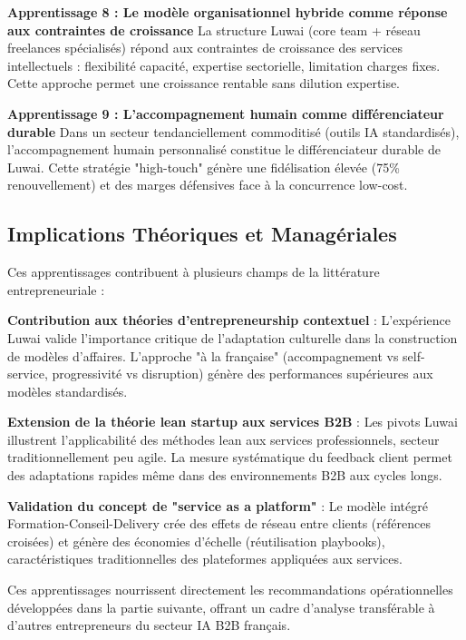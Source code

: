 \textbf{Apprentissage 8 : Le modèle organisationnel hybride comme réponse aux contraintes de croissance}
La structure Luwai (core team + réseau freelances spécialisés) répond aux contraintes de croissance des services intellectuels : flexibilité capacité, expertise sectorielle, limitation charges fixes. Cette approche permet une croissance rentable sans dilution expertise.

\textbf{Apprentissage 9 : L'accompagnement humain comme différenciateur durable}
Dans un secteur tendanciellement commoditisé (outils IA standardisés), l'accompagnement humain personnalisé constitue le différenciateur durable de Luwai. Cette stratégie "high-touch" génère une fidélisation élevée (75\% renouvellement) et des marges défensives face à la concurrence low-cost.

\subsection{Implications Théoriques et Managériales}

Ces apprentissages contribuent à plusieurs champs de la littérature entrepreneuriale :

\textbf{Contribution aux théories d'entrepreneurship contextuel} \cite{welter2011contextualizing} :
L'expérience Luwai valide l'importance critique de l'adaptation culturelle dans la construction de modèles d'affaires. L'approche "à la française" (accompagnement vs self-service, progressivité vs disruption) génère des performances supérieures aux modèles standardisés.

\textbf{Extension de la théorie lean startup aux services B2B} \cite{ries2011lean} :
Les pivots Luwai illustrent l'applicabilité des méthodes lean aux services professionnels, secteur traditionnellement peu agile. La mesure systématique du feedback client permet des adaptations rapides même dans des environnements B2B aux cycles longs.

\textbf{Validation du concept de "service as a platform"} \cite{parker2016platform} :
Le modèle intégré Formation-Conseil-Delivery crée des effets de réseau entre clients (références croisées) et génère des économies d'échelle (réutilisation playbooks), caractéristiques traditionnelles des plateformes appliquées aux services.

Ces apprentissages nourrissent directement les recommandations opérationnelles développées dans la partie suivante, offrant un cadre d'analyse transférable à d'autres entrepreneurs du secteur IA B2B français.